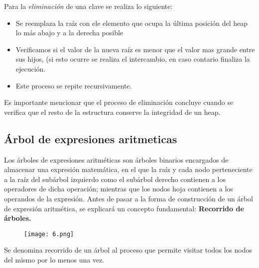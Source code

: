 \documentclass{article}
\begin{document}
Para la \textit{eliminación} de una clave se realiza lo siguiente: 
\begin{itemize}
\item Se reemplaza la raíz con ele elemento que ocupa la última posición del heap lo más abajo y a la derecha posible
\item Verificamos si el valor de la nueva raíz es menor que el valor mas grande entre sus hijos, (si esto ocurre se realiza el intercambio, en caso contario finaliza la ejecución.
\item Este proceso se repite recursivamente. 
\end{itemize}

Es importante mencionar que el proceso de eliminación concluye cuando se verifica que el resto de la estructura conserve la integridad de un heap. 
\newpage
\subsection{Árbol de expresiones aritmeticas}
 
Los árboles de expresiones aritméticas son árboles binarios encargados de almacenar una expresión matemática, en el que la raíz y cada nodo perteneciente a la raíz del subárbol izquierdo como el subárbol derecho contienen a los operadores de dicha operación; mientras que los nodos hoja contienen a los operandos de la expresión.
Antes de pasar a la forma de construcción de un árbol de expresión aritmética, se explicará un concepto fundamental: \textbf{Recorrido de árboles.}\\

\begin{figure}[h]
\centering
\texttt{[image: 6.png]}
\end{figure}

Se denomina recorrido de un árbol al proceso que permite visitar todos los nodos del mismo por lo menos una vez.\\
\end{document}
